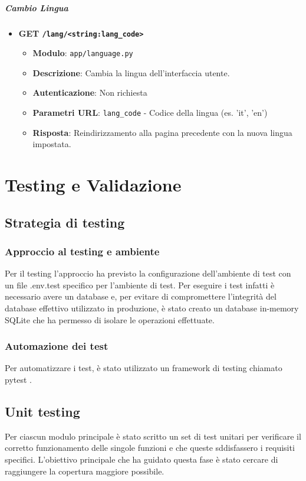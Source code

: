 \documentclass[12pt,a4paper,oneside]{report}
\begin{document}
\paragraph{Cambio Lingua}
\begin{itemize}
    \item \textbf{GET \texttt{/lang/<string:lang\_code>}}
          \begin{itemize}
              \item \textbf{Modulo}: \texttt{app/language.py}
              \item \textbf{Descrizione}: Cambia la lingua dell'interfaccia utente.
              \item \textbf{Autenticazione}: Non richiesta
              \item \textbf{Parametri URL}: \texttt{lang\_code} - Codice della lingua (es. 'it', 'en')
              \item \textbf{Risposta}: Reindirizzamento alla pagina precedente con la nuova lingua impostata.
          \end{itemize}
\end{itemize}


\chapter{Testing e Validazione}
\section{Strategia di testing}
\subsection{Approccio al testing e ambiente}
Per il testing l'approccio ha previsto la configurazione dell'ambiente di test con un file .env.test specifico per l'ambiente di test.
Per eseguire i test infatti è necessario avere un database e, per evitare di compromettere l'integrità del database effettivo utilizzato in produzione, è stato creato un database in-memory SQLite che ha permesso di isolare le operazioni effettuate.
\subsection{Automazione dei test}
Per automatizzare i test, è stato utilizzato un framework di testing chiamato pytest \cite{pytest}.
\section{Unit testing}
Per ciascun modulo principale è stato scritto un set di test unitari per verificare il corretto funzionamento delle singole funzioni e che queste sddisfassero i requisiti specifici.
L'obiettivo principale che ha guidato questa fase è stato cercare di raggiungere la copertura maggiore possibile.
\end{document}
